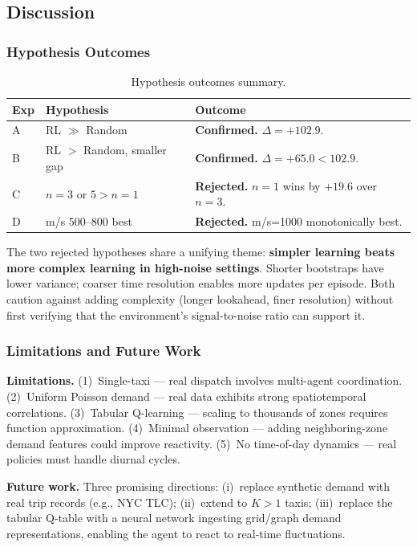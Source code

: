 \subsection{Discussion}

\subsubsection{Hypothesis Outcomes}

\begin{table}[ht]
\centering
\caption{Hypothesis outcomes summary.}
\label{tab:hypotheses}
\begin{tabular}{llp{5cm}}
\toprule
\textbf{Exp} & \textbf{Hypothesis} & \textbf{Outcome} \\
\midrule
A & RL $\gg$ Random & \textbf{Confirmed.} $\Delta{=}{+}102.9$. \\
B & RL $>$ Random, smaller gap & \textbf{Confirmed.} $\Delta{=}{+}65.0 < 102.9$. \\
C & $n{=}3$ or $5 > n{=}1$ & \textbf{Rejected.} $n{=}1$ wins by $+19.6$ over $n{=}3$. \\
D & m/s 500--800 best & \textbf{Rejected.} m/s{=}1000 monotonically best. \\
\bottomrule
\end{tabular}
\end{table}

The two rejected hypotheses share a unifying theme: \textbf{simpler learning beats more complex learning in high-noise settings}. Shorter bootstraps have lower variance; coarser time resolution enables more updates per episode. Both caution against adding complexity (longer lookahead, finer resolution) without first verifying that the environment's signal-to-noise ratio can support it.

\subsubsection{Limitations and Future Work}

\textbf{Limitations.} (1)~Single-taxi — real dispatch involves multi-agent coordination. (2)~Uniform Poisson demand — real data exhibits strong spatiotemporal correlations. (3)~Tabular Q-learning — scaling to thousands of zones requires function approximation. (4)~Minimal observation — adding neighboring-zone demand features could improve reactivity. (5)~No time-of-day dynamics — real policies must handle diurnal cycles.

\textbf{Future work.} Three promising directions: (i)~replace synthetic demand with real trip records (e.g., NYC TLC); (ii)~extend to $K{>}1$ taxis; (iii)~replace the tabular Q-table with a neural network ingesting grid/graph demand representations, enabling the agent to react to real-time fluctuations.

